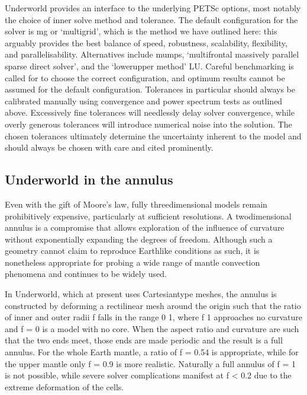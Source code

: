 \documentclass[letterpaper,10pt,english]{jupyterBook}
\begin{document}
\sphinxAtStartPar
Underworld provides an interface to the underlying PETSc options, most notably the choice of inner solve method and tolerance. The default configuration for the solver is mg or ‘multigrid’, which is the method we have outlined here: this arguably provides the best balance of speed, robustness, scalability, flexibility, and parallelisability. Alternatives include mumps, ‘multifrontal massively parallel sparse direct solver’, and the ‘lower\sphinxhyphen{}upper method’ LU. Careful benchmarking is called for to choose the correct configuration, and optimum results cannot be assumed for the default configuration. Tolerances in particular should always be calibrated manually using convergence and power spectrum tests as outlined above. Excessively fine tolerances will needlessly delay solver convergence, while overly generous tolerances will introduce numerical noise into the solution. The chosen tolerances ultimately determine the uncertainty inherent to the model and should always be chosen with care and cited prominently.


\subsection{Underworld in the annulus}
\label{\detokenize{content/chapter_02_methods/section2:underworld-in-the-annulus}}
\sphinxAtStartPar
Even with the gift of Moore’s law, fully three\sphinxhyphen{}dimensional models remain prohibitively expensive, particularly at sufficient resolutions. A two\sphinxhyphen{}dimensional annulus is a compromise that allows exploration of the influence of curvature without exponentially expanding the degrees of freedom. Although such a geometry cannot claim to reproduce Earth\sphinxhyphen{}like conditions as such, it is nonetheless appropriate for probing a wide range of mantle convection phenomena and continues to be widely used.

\sphinxAtStartPar
In Underworld, which at present uses Cartesian\sphinxhyphen{}type meshes, the annulus is constructed by deforming a rectilinear mesh around the origin such that the ratio of inner and outer radii f falls in the range 0  1, where f  1 approaches no curvature and f = 0 is a model with no core. When the aspect ratio and curvature are such that the two ends meet, those ends are made periodic and the result is a full annulus. For the whole Earth mantle, a ratio of f = 0.54 is appropriate, while for the upper mantle only f = 0.9 is more realistic. Naturally a full annulus of f = 1 is not possible, while severe solver complications manifest at f < 0.2 due to the extreme deformation of the cells.
\end{document}
